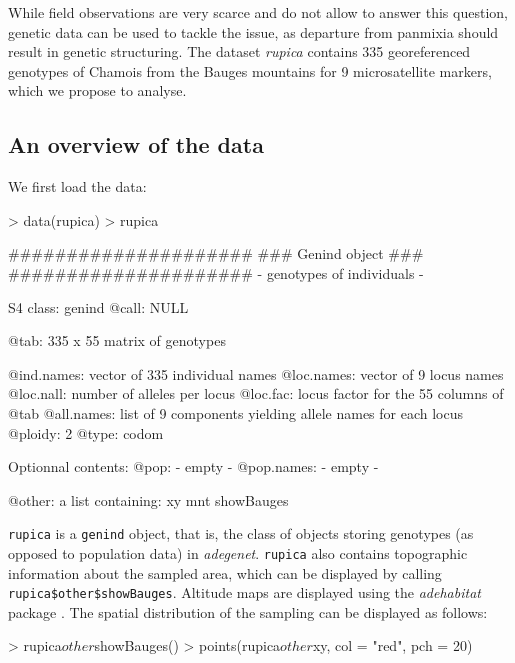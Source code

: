 \documentclass{article}
\begin{document}
While field observations are very scarce and do not allow to answer
this question, genetic data can be used to tackle the issue, as
departure from panmixia should result in genetic structuring.
The dataset \textit{rupica} contains 335 georeferenced genotypes of Chamois from the
Bauges mountains for 9 microsatellite markers, which we propose to
analyse.



\subsection{An overview of the data}
We first load the data:
\begin{Schunk}
\begin{Sinput}
> data(rupica)
> rupica
\end{Sinput}
\begin{Soutput}
   #####################
   ### Genind object ### 
   #####################
- genotypes of individuals - 

S4 class:  genind
@call: NULL

@tab:  335 x 55 matrix of genotypes

@ind.names: vector of  335 individual names
@loc.names: vector of  9 locus names
@loc.nall: number of alleles per locus
@loc.fac: locus factor for the  55 columns of @tab
@all.names: list of  9 components yielding allele names for each locus
@ploidy:  2
@type:  codom

Optionnal contents: 
@pop:  - empty -
@pop.names:  - empty -

@other: a list containing: xy  mnt  showBauges 
\end{Soutput}
\end{Schunk}
\texttt{rupica} is a \texttt{genind} object, that is, the class
of objects storing genotypes (as opposed to population data) in \textit{adegenet}.
\texttt{rupica} also contains topographic information about the
sampled area, which can be displayed by calling
\texttt{rupica\$other\$showBauges}.
Altitude maps are displayed using the \textit{adehabitat} package \cite{tj440}.
The spatial distribution of the sampling can be displayed as follows:
\begin{Schunk}
\begin{Sinput}
> rupica$other$showBauges()
> points(rupica$other$xy, col = "red", pch = 20)
\end{Sinput}
\end{Schunk}
\end{document}
